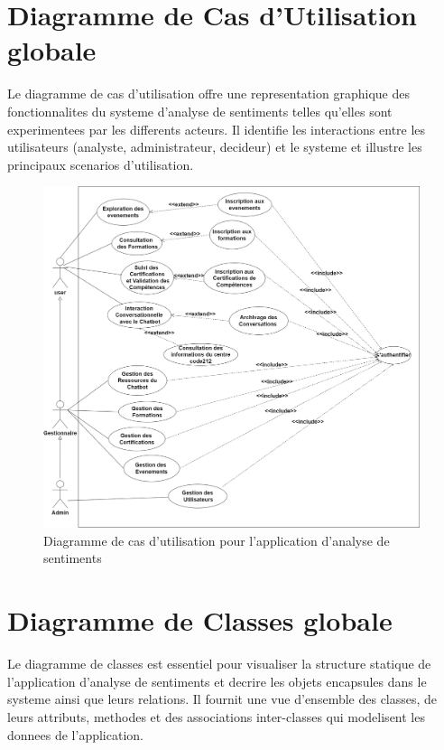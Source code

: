 \section{Diagramme de Cas d'Utilisation globale}

Le diagramme de cas d'utilisation offre une representation graphique des fonctionnalites du systeme d'analyse de sentiments telles qu'elles sont experimentees par les differents acteurs. Il identifie les interactions entre les utilisateurs (analyste, administrateur, decideur) et le systeme et illustre les principaux scenarios d'utilisation.

\begin{figure}[H]
\centering
\includegraphics[height=10cm , width=\textwidth]{assets/images/usecase.png}
\caption{Diagramme de cas d'utilisation pour l'application d'analyse de sentiments}
\label{fig:usecase-global}
\end{figure}

\section{Diagramme de Classes globale}

Le diagramme de classes est essentiel pour visualiser la structure statique de l'application d'analyse de sentiments et decrire les objets encapsules dans le systeme ainsi que leurs relations. Il fournit une vue d'ensemble des classes, de leurs attributs, methodes et des associations inter-classes qui modelisent les donnees de l'application.

